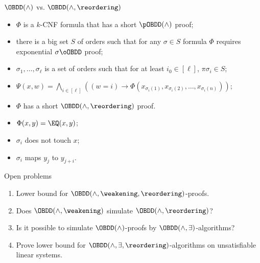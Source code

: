 \begin{frame}{$\OBDD(\land)$ vs. $\OBDD(\land, \reordering)$}

    \pause
    \begin{itemize}
        \item $\Phi$ is a $k$-CNF formula that has a short $\pOBDD(\land)$ proof;
        \pause
        \item there is a {\color{blue} big} set $S$ of orders such that for any $\sigma \in S$ formula
            $\Phi$ requires exponential $\sigma\oOBDD$ proof;
        \pause
        \item $\sigma_1, \dots, \sigma_{\ell}$ is a set of orders such that for at least $i_0 \in [\ell]$,
            $\pi\sigma_i \in S$;
        \pause
        \item $\Psi(x, w) = \bigwedge\limits_{i \in [\ell]} \left((w = i) \to \Phi(x_{\sigma_i(1)},
            x_{\sigma_i(2)}, \dots, x_{\sigma_i(n)}) \right)$;
        \pause
        \item $\Phi$ has a short $\OBDD(\land, \reordering)$ proof.
    \end{itemize}

    \vspace{0.4cm}
    \pause
    \begin{itemize}
        \item $\Phi(x, y) = \EQ(x, y)$;
        \item $\sigma_i$ does not touch $x$;
        \item $\sigma_i$ maps $y_j$ to $y_{j + i}$.
    \end{itemize}
    
\end{frame}


\begin{frame}{Open problems}
	\begin{enumerate}
        \item Lower bound for $\OBDD(\land, \weakening, \reordering)$-proofs.
        \item Does $\OBDD(\land, \weakening)$ simulate $\OBDD(\land, \reordering)$?
        \item Is it possible to simulate $\OBDD(\land)$-proofs by $\OBDD(\land, \exists)$-algorithms?
        \item Prove lower bound for $\OBDD(\land, \exists, \reordering)$-algorithms on unsatisfiable
            linear systems.
    \end{enumerate}    
\end{frame}
